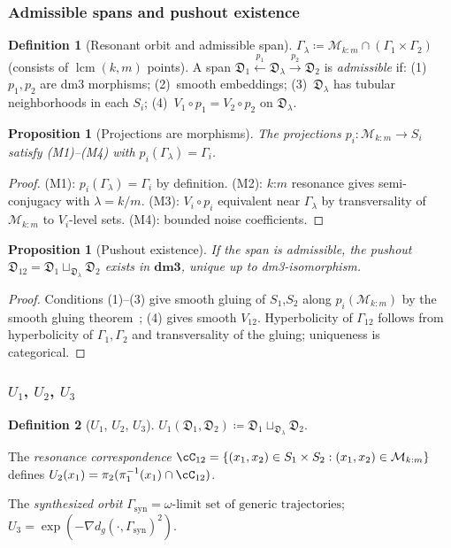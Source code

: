 \documentclass[12pt, oneside]{book}
\theoremstyle{plain}
\newtheorem{proposition}[theorem]{Proposition}
\theoremstyle{definition}
\newtheorem{definition}{Definition}[section]
\theoremstyle{remark}
\newcommand{\dm}{\mathfrak{D}}
\newcommand{\dmcat}{\mathbf{dm3}}
\newcommand{\Orb}{\Gamma}
\newcommand{\cM}{\mathcal{M}}
\newcommand{\dg}{d_g}
\DeclareMathOperator{\lcm}{lcm}
\begin{document}
\subsubsection{Admissible spans and pushout existence}

\begin{definition}[Resonant orbit and admissible span]\label{def:span}
$\Orb_\lambda\coloneqq\cM_{k:m}\cap(\Orb_1\times\Orb_2)$
(consists of $\lcm(k,m)$ points). A span
$\dm_1\xleftarrow{p_1}\dm_\lambda\xrightarrow{p_2}\dm_2$
is \emph{admissible} if: (1)~$p_1,p_2$ are dm3 morphisms;
(2)~smooth embeddings; (3)~$\dm_\lambda$ has tubular neighborhoods
in each $S_i$; (4)~$V_1\circ p_1=V_2\circ p_2$ on $\dm_\lambda$.
\end{definition}

\begin{proposition}[Projections are morphisms]\label{prop:proj}
The projections $p_i\colon\cM_{k:m}\to S_i$ satisfy (M1)--(M4)
with $p_i(\Orb_\lambda)=\Orb_i$.
\end{proposition}
\begin{proof}
(M1): $p_i(\Orb_\lambda)=\Orb_i$ by definition.
(M2): $k$:$m$ resonance gives semi-conjugacy with $\lambda=k/m$.
(M3): $V_i\circ p_i$ equivalent near $\Orb_\lambda$ by transversality
of $\cM_{k:m}$ to $V_i$-level sets.
(M4): bounded noise coefficients.
\end{proof}

\begin{proposition}[Pushout existence]\label{prop:pushout}
If the span is admissible, the pushout
$\dm_{12}=\dm_1\sqcup_{\dm_\lambda}\dm_2$ exists in $\dmcat$,
unique up to dm3-isomorphism.
\end{proposition}
\begin{proof}
Conditions (1)--(3) give smooth gluing of $S_1$,$S_2$ along
$p_i(\cM_{k:m})$ by the smooth gluing theorem~\cite{Lee};
(4) gives smooth $V_{12}$. Hyperbolicity of $\Orb_{12}$ follows
from hyperbolicity of $\Orb_1,\Orb_2$ and transversality of the
gluing; uniqueness is categorical.
\end{proof}

\subsubsection{\texorpdfstring{$U_1$, $U_2$, $U_3$}{U1, U2, U3}}

\begin{definition}[$U_1$, $U_2$, $U_3$]\label{def:U}
$U_1(\dm_1,\dm_2)\coloneqq\dm_1\sqcup_{\dm_\lambda}\dm_2$.

The \emph{resonance correspondence}
$\cC_{12}=\{(x_1,x_2)\in S_1\times S_2:(x_1,x_2)\in\cM_{k:m}\}$
defines $U_2(x_1)=\pi_2(\pi_1^{-1}(x_1)\cap\cC_{12})$.

The \emph{synthesized orbit}
$\Orb_{\mathrm{syn}}=\omega\text{-limit set of generic trajectories}$;
$U_3=\exp(-\nabla\dg(\cdot,\Orb_{\mathrm{syn}})^2)$.
\end{definition}
\end{document}

